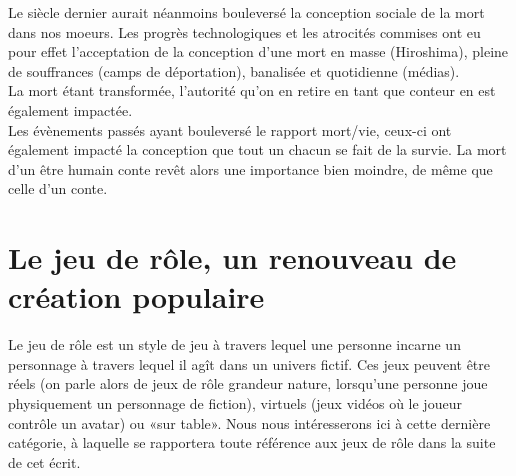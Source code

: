\documentclass[a4paper,12pt,final,oneside]{article}
\begin{document}
Le siècle dernier aurait néanmoins bouleversé la conception sociale de la mort dans nos moeurs. Les progrès technologiques et les atrocités commises ont eu pour effet l'acceptation de la conception d'une mort en masse (Hiroshima), pleine de souffrances (camps de déportation), banalisée et quotidienne (médias).\\
La mort étant transformée, l'autorité qu'on en retire en tant que conteur en est également impactée.\\
Les évènements passés ayant bouleversé le rapport mort/vie, ceux-ci ont également impacté la conception que tout un chacun se fait de la survie. La mort d'un être humain conte revêt alors une importance bien moindre, de même que celle d'un conte.


\clearpage


\section{Le jeu de rôle, un renouveau de création populaire}
Le jeu de rôle est un style de jeu à travers lequel une personne incarne un personnage à travers lequel il agît dans un univers fictif. Ces jeux peuvent être réels (on parle alors de jeux de rôle grandeur nature, lorsqu'une personne joue physiquement un personnage de fiction), virtuels (jeux vidéos où le joueur contrôle un avatar) ou «sur table». Nous nous intéresserons ici à cette dernière catégorie, à laquelle se rapportera toute référence aux jeux de rôle dans la suite de cet écrit.
\end{document}
